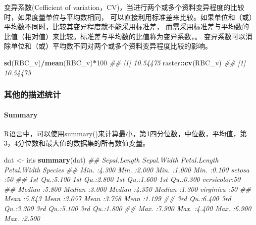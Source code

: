 \documentclass[
]{article}
\newenvironment{Shaded}{\begin{snugshade}}{\end{snugshade}}
\newcommand{\CommentTok}[1]{\textcolor[rgb]{0.56,0.35,0.01}{\textit{#1}}}
\newcommand{\DecValTok}[1]{\textcolor[rgb]{0.00,0.00,0.81}{#1}}
\newcommand{\KeywordTok}[1]{\textcolor[rgb]{0.13,0.29,0.53}{\textbf{#1}}}
\newcommand{\NormalTok}[1]{#1}
\newcommand{\OperatorTok}[1]{\textcolor[rgb]{0.81,0.36,0.00}{\textbf{#1}}}
\newcommand{\StringTok}[1]{\textcolor[rgb]{0.31,0.60,0.02}{#1}}
\begin{document}
变异系数(Cefficient of variation，CV)，当进行两个或多个资料变异程度的比较时，如果度量单位与平均数相同，
可以直接利用标准差来比较。如果单位和（或）平均数不同时，比较其变异程度就不能采用标准差，
而需采用标准差与平均数的比值（相对值）来比较。标准差与平均数的比值称为变异系数，。
变异系数可以消除单位和（或）平均数不同对两个或多个资料变异程度比较的影响。

\begin{Shaded}
\begin{Highlighting}[]
\KeywordTok{sd}\NormalTok{(RBC_v)}\OperatorTok{/}\KeywordTok{mean}\NormalTok{(RBC_v)}\OperatorTok{*}\DecValTok{100}
\CommentTok{## [1] 10.54475}
\NormalTok{raster}\OperatorTok{::}\KeywordTok{cv}\NormalTok{(RBC_v)}
\CommentTok{## [1] 10.54475}
\end{Highlighting}
\end{Shaded}

\hypertarget{ux5176ux4ed6ux7684ux63cfux8ff0ux7edfux8ba1}{%
\subsubsection{其他的描述统计}\label{ux5176ux4ed6ux7684ux63cfux8ff0ux7edfux8ba1}}

\hypertarget{summary}{%
\paragraph{Summary}\label{summary}}

R语言中，可以使用summary()来计算最小，第1四分位数，中位数，平均值，第3，4分位数和最大值的数据集的所有数值变量。

\begin{Shaded}
\begin{Highlighting}[]
\NormalTok{dat <-}\StringTok{ }\NormalTok{iris}
\KeywordTok{summary}\NormalTok{(dat)}
\CommentTok{##  Sepal.Length    Sepal.Width     Petal.Length    Petal.Width          Species  }
\CommentTok{## Min.   :4.300   Min.   :2.000   Min.   :1.000   Min.   :0.100   setosa    :50  }
\CommentTok{## 1st Qu.:5.100   1st Qu.:2.800   1st Qu.:1.600   1st Qu.:0.300   versicolor:50  }
\CommentTok{## Median :5.800   Median :3.000   Median :4.350   Median :1.300   virginica :50  }
\CommentTok{## Mean   :5.843   Mean   :3.057   Mean   :3.758   Mean   :1.199                  }
\CommentTok{## 3rd Qu.:6.400   3rd Qu.:3.300   3rd Qu.:5.100   3rd Qu.:1.800                  }
\CommentTok{## Max.   :7.900   Max.   :4.400   Max.   :6.900   Max.   :2.500                  }
\end{Highlighting}
\end{Shaded}
\end{document}
